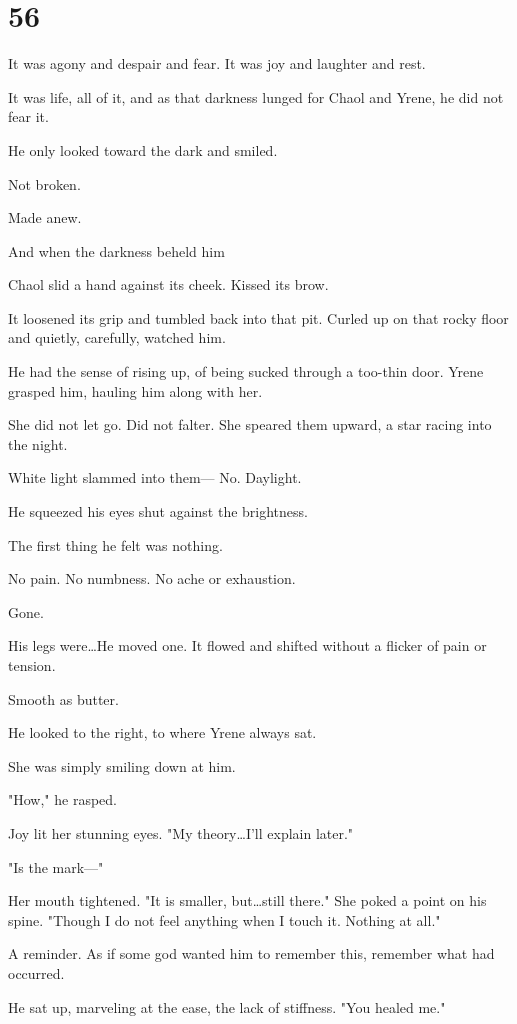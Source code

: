 
\chapter{56}

It was agony and despair and fear.
It was joy and laughter and rest.

It was life, all of it, and as that darkness lunged for Chaol and Yrene, he did not fear it.

He only looked toward the dark and smiled.

Not broken.

Made anew.

And when the darkness beheld him 

Chaol slid a hand against its cheek.
Kissed its brow.

It loosened its grip and tumbled back into that pit.
Curled up on that rocky floor and quietly, carefully, watched him.

He had the sense of rising up, of being sucked through a too-thin door.
Yrene grasped him, hauling him along with her.

She did not let go.
Did not falter.
She speared them upward, a star racing into the night.

White light slammed into them--- No.
Daylight.

He squeezed his eyes shut against the brightness.

The first thing he felt was nothing.

No pain.
No numbness.
No ache or exhaustion.

Gone.

His legs were\ldots He moved one.
It flowed and shifted without a flicker of pain or tension.

Smooth as butter.

He looked to the right, to where Yrene always sat.

She was simply smiling down at him.

"How," he rasped.

Joy lit her stunning eyes.
"My theory\ldots I'll explain later."

"Is the mark---"

Her mouth tightened.
"It is smaller, but\ldots still there."
She poked a point on his spine.
"Though I do not feel anything when I touch it.
Nothing at all."

A reminder.
As if some god wanted him to remember this, remember what had occurred.

He sat up, marveling at the ease, the lack of stiffness.
"You healed me."

